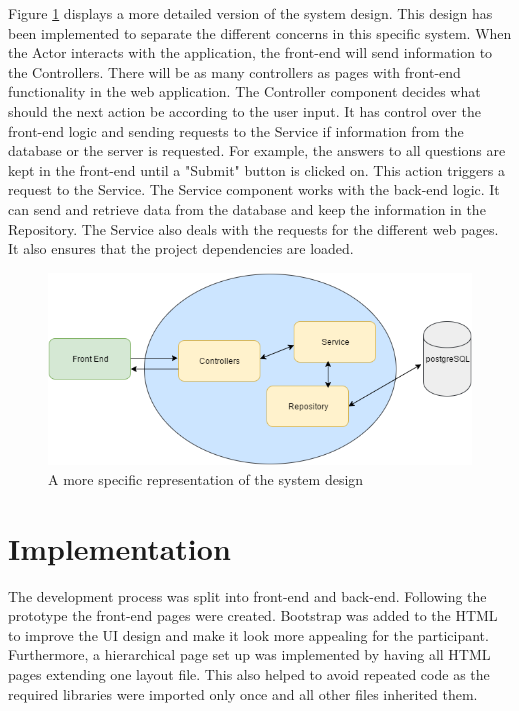 \documentclass{l4proj}
\begin{document}
Figure \ref{moreSpecificDesign} displays a more detailed version of the system design. This design has been implemented to separate the different concerns in this specific system. When the Actor interacts with the application, the front-end will send information to the Controllers. There will be as many controllers as pages with front-end functionality in the web application. The Controller component decides what should the next action be according to the user input. It has control over the front-end logic and sending requests to the Service if information from the database or the server is requested. For example, the answers to all questions are kept in the front-end until a "Submit" button is clicked on. This action triggers a request to the Service. The Service component works with the back-end logic. It can send and retrieve data from the database and keep the information in the Repository. The Service also deals with the requests for the different web pages. It also ensures that the project dependencies are loaded.   

\begin{figure}[H]
\centering
\includegraphics[width=13cm]{moreSpecificDesign.png}
\caption{A more specific representation of the system design}
\label{moreSpecificDesign}
\end{figure}


\section{Implementation}

The development process was split into front-end and back-end. Following the prototype the front-end pages were created. Bootstrap was added to the HTML to improve the UI design and make it look more appealing for the participant. Furthermore, a hierarchical page set up was implemented by having all HTML pages extending one layout file. This also helped to avoid repeated code as the required libraries were imported only once and all other files inherited them. 
\end{document}
